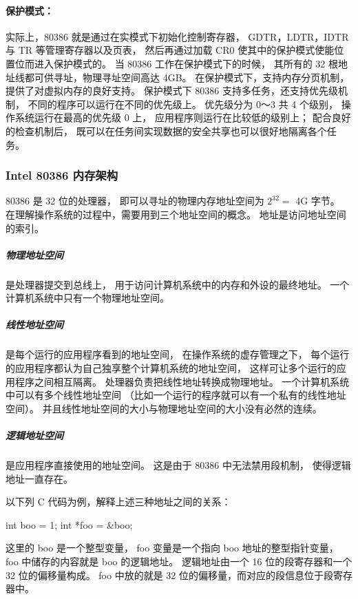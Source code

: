 \paragraph{保护模式：}
实际上，80386 就是通过在实模式下初始化控制寄存器，
GDTR，LDTR，IDTR 与 TR 等管理寄存器以及页表，
然后再通过加载 CR0 使其中的保护模式使能位置位而进入保护模式的。
当 80386 工作在保护模式下的时候，
其所有的 32 根地址线都可供寻址，物理寻址空间高达 4GB。
在保护模式下，支持内存分页机制，
提供了对虚拟内存的良好支持。
保护模式下 80386 支持多任务，还支持优先级机制，
不同的程序可以运行在不同的优先级上。
优先级分为 0～3 共 4 个级别，
操作系统运行在最高的优先级 0 上，
应用程序则运行在比较低的级别上；
配合良好的检查机制后，
既可以在任务间实现数据的安全共享也可以很好地隔离各个任务。

\subsubsection{Intel 80386 内存架构}

80386 是 32 位的处理器，
即可以寻址的物理内存地址空间为 $2^{32} =$ 4G 字节。
在理解操作系统的过程中，需要用到三个地址空间的概念。
地址是访问地址空间的索引。
\subparagraph{物理地址空间}
是处理器提交到总线上，
用于访问计算机系统中的内存和外设的最终地址。
一个计算机系统中只有一个物理地址空间。

\subparagraph{线性地址空间}
是每个运行的应用程序看到的地址空间，
在操作系统的虚存管理之下，
每个运行的应用程序都认为自己独享整个计算机系统的地址空间，
这样可让多个运行的应用程序之间相互隔离。
处理器负责把线性地址转换成物理地址。
一个计算机系统中可以有多个线性地址空间
（比如一个运行的程序就可以有一个私有的线性地址空间）。
并且线性地址空间的大小与物理地址空间的大小没有必然的连续。

\subparagraph{逻辑地址空间}
是应用程序直接使用的地址空间。
这是由于 80386 中无法禁用段机制，
使得逻辑地址一直存在。

以下列 C 代码为例，解释上述三种地址之间的关系：

\begin{small}
\begin{ccode1}
int boo = 1;
int *foo = &boo;
\end{ccode1}
\end{small}

\noindent
这里的 boo 是一个整型变量，
foo 变量是一个指向 boo 地址的整型指针变量，
foo 中储存的内容就是 boo 的逻辑地址。
逻辑地址由一个 16 位的段寄存器和一个 32 位的偏移量构成。
foo 中放的就是 32 位的偏移量，而对应的段信息位于段寄存器中。


